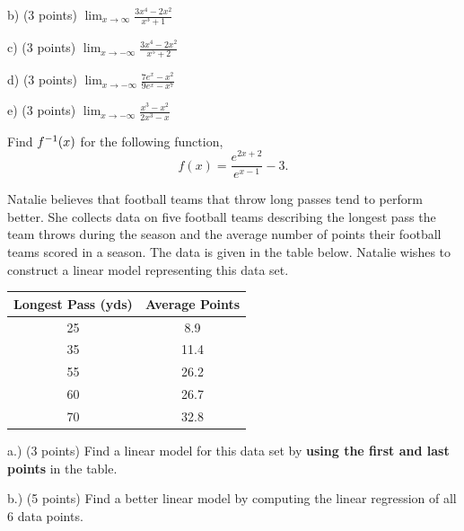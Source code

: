 \documentclass[11pt]{article}
\newcommand{\inv}{\ensuremath ^{-1}}
\begin{document}
\begin{questions}
b) (3 points)  $\displaystyle \lim_{x\to\infty} \frac{3x^4 - 2x^2}{x^3 +1}$

\vspace{1.25in}

c)  (3 points)  $\displaystyle \lim_{x\to-\infty} \frac{3x^4 - 2x^2}{x^5 +2}$

\vspace{1.25in}

d) (3 points) $\displaystyle \lim_{x\to-\infty} \frac{7e^x - x^2}{9e^x -x^7}$

\vspace{1.25in}

e)  (3 points) $\displaystyle \lim_{x\to-\infty} \frac{x^3 - x^2}{2x^3 -x}$

\vspace{1.25in}


\question[10] Find $f\inv(x)$ for the following function,
\[f(x) = \frac{e^{2x+2}}{e^{x-1}} - 3.\]

\vspace{3.25in}


\question[15] Natalie believes that football teams that throw long passes tend to perform better.  She collects data on five football teams describing the longest pass the team throws during the season and the average number of points their football teams scored in a season.  The data is given in the table below.  Natalie wishes to construct a linear model representing this data set.\\
\begin{center}
  \begin{tabular}{| c | c |}
    \hline
    Longest Pass (yds) & Average Points \\ \hline \hline
    25 & 8.9  \\ \hline
    35 & 11.4  \\ \hline
    55 & 26.2  \\ \hline
    60 & 26.7  \\ \hline
    70 & 32.8  \\ \hline
  \end{tabular}
\end{center}

a.) (3 points) Find a linear model for this data set by \textbf{using the first and last points} in the table.
\vspace{2.00in}

b.) (5 points) Find a better linear model by computing the linear regression of all 6 data points.
\vspace{1.25in}



\end{questions}
\end{document}
